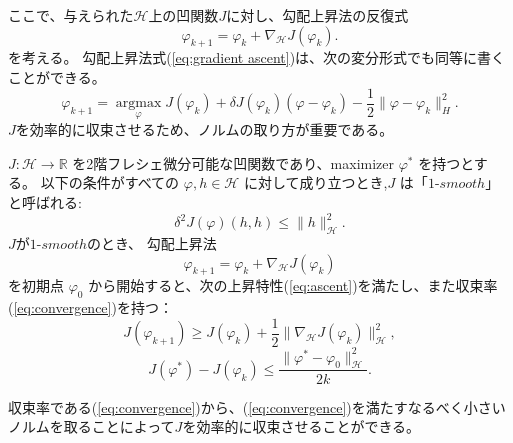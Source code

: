 ここで、与えられた$\mathcal{H}$上の凹関数$J$に対し、勾配上昇法の反復式
\begin{equation}
    \label{eq:gradient ascent}
    \varphi_{k+1} = \varphi_k + \nabla_\mathcal{H} J(\varphi_k).
\end{equation}
を考える。
勾配上昇法式(\ref{eq:gradient ascent})は、次の変分形式でも同等に書くことができる。
\begin{equation}
    \label{eq:gradient ascent variational}
    \varphi_{k+1} =  \underset{\varphi} {\operatorname{argmax}} J(\varphi_k) + \delta J(\varphi_k)(\varphi-\varphi_k) - \frac{1}{2}\|\varphi-\varphi_k\|_H^2.
\end{equation}
$J$を効率的に収束させるため、ノルムの取り方が重要である。
\begin{thm}
    \label{thm:chose norm}
    $J: \mathcal{H} \rightarrow \mathbb{R}$ を2階フレシェ微分可能な凹関数であり、maximizer $\varphi^*$ を持つとする。
    以下の条件がすべての $\varphi, h \in \mathcal{H}$ に対して成り立つとき,$J$ は「$1$-$smooth$」と呼ばれる:
    \begin{equation}
        \label{eq:1-smooth}
        \delta^2 J(\varphi)(h, h) \leq \|h\|_\mathcal{H}^2.
    \end{equation}
    $J$が$1$-$smooth$のとき、
    勾配上昇法 
    $$
        \varphi_{k+1} = \varphi_k + \nabla_\mathcal{H} J(\varphi_k)
    $$
    を初期点 $\varphi_0$ から開始すると、次の上昇特性(\ref{eq:ascent})を満たし、また収束率(\ref{eq:convergence})を持つ：
    \begin{equation}
        \label{eq:ascent}
        J(\varphi_{k+1}) \geq J(\varphi_k) + \frac{1}{2}\|\nabla_\mathcal{H} J(\varphi_k)\|_\mathcal{H}^2,
    \end{equation}
    \begin{equation}
        \label{eq:convergence}
        J(\varphi^*) - J(\varphi_k) \leq \frac{\|\varphi^* - \varphi_0\|_\mathcal{H}^2}{2k}.
    \end{equation}
\end{thm}
収束率である(\ref{eq:convergence})から、(\ref{eq:convergence})を満たすなるべく小さいノルムを取ることによって$J$を効率的に収束させることができる。



